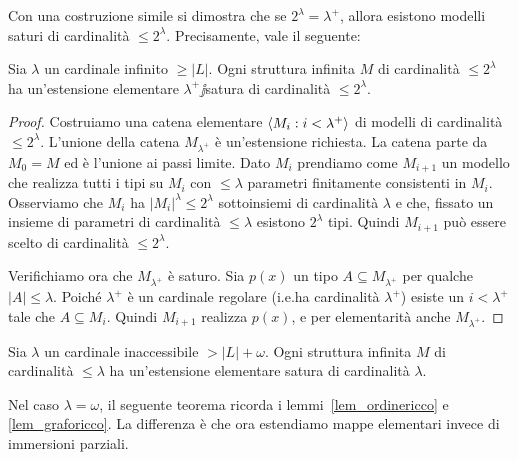 Con una costruzione simile si dimostra che se $2^\lambda=\lambda^+$, allora esistono modelli saturi di cardinalit\`a  $\le2^\lambda$. Precisamente, vale il seguente:

\begin{theorem}
Sia $\lambda$ un cardinale infinito $\ge|L|$. Ogni struttura infinita $M$ di cardinalit\`a $\le2^\lambda$ ha un'estensione elementare $\lambda^+\!\jj$satura di cardinalit\`a $\le2^\lambda$.
\end{theorem}

\begin{proof}
Costruiamo una catena elementare $\langle M_i : i<\lambda^+\rangle$ di modelli di cardinalit\`a $\le2^\lambda$. L'unione della catena $M_{\lambda^+}$ \`e un'estensione richiesta. La catena parte da $M_0=M$ ed \`e l'unione ai passi limite. Dato $M_i$ prendiamo come $M_{i+1}$ un modello che realizza tutti i tipi su $M_i$ con $\le\lambda$ parametri finitamente consistenti in $M_i$. Osserviamo che $M_i$ ha $|M_i|^\lambda\le2^\lambda$ sottoinsiemi di cardinalit\`a $\lambda$ e che, fissato un insieme di parametri di cardinalit\`a $\le\lambda$ esistono $2^\lambda$ tipi. Quindi $M_{i+1}$ pu\`o essere scelto di cardinalit\`a $\le2^\lambda$.

Verifichiamo ora che $M_{\lambda^+}$ \`e saturo. Sia $p(x)$ un tipo $A\subseteq M_{\lambda^+}$ per qualche $|A|\le\lambda$. Poich\'e $\lambda^+$ \`e un cardinale regolare (i.e.\@ ha cardinalit\`a $\lambda^+$) esiste un $i<\lambda^+$ tale che $A\subseteq M_i$. Quindi $M_{i+1}$ realizza $p(x)$, e per elementarit\`a anche $M_{\lambda^+}$.
\end{proof}

\begin{corollary}
Sia $\lambda$ un cardinale inaccessibile $>|L|+\omega$. Ogni struttura infinita $M$ di cardinalit\`a $\le\lambda$ ha un'estensione elementare satura di cardinalit\`a $\lambda$.
\end{corollary}


Nel caso $\lambda=\omega$, il seguente teorema ricorda i lemmi~\ref{lem_ordinericco} e \ref{lem_graforicco}. La differenza \`e che ora estendiamo mappe elementari invece di immersioni parziali.

